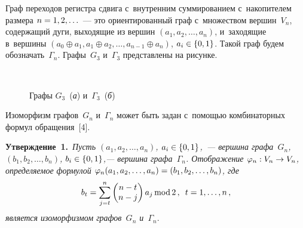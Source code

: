 \begin{multicols}{2}
  Граф переходов регистра сдвига с~внутренним суммированием 
с~накопителем размера $n\hm=1,2,\ldots$~--- это ориентированный граф 
с~множеством вершин~$V_n$, содержащий дуги, выходящие из вершин $(a_1, 
a_2, \ldots , a_n)$, и~заходящие в~вершины $(a_0\oplus a_1, a_1\oplus a_2, \ldots 
, a_{n-1}\oplus a_n)$, $a_i\hm\in \{0,1\}$. Такой граф будем 
обозначать~$\Gamma_n$. Графы~$G_3$ и~$\Gamma_3$ пред\-став\-ле\-ны на 
рисунке.
  
  \begin{figure*} %
\vspace*{1pt}
 \begin{center}
 \mbox{%
 \epsfxsize=158.296mm 
 }
\vspace*{6pt}

  {\small Графы $G_3$~(\textit{а}) и~$\Gamma_3$~(\textit{б})}
 \end{center}
\vspace*{-12pt}
  \end{figure*}
  
  Изоморфизм графов~$G_n$ и~$\Gamma_n$ может быть задан с~помощью 
комбинаторных формул обращения~[4].
  
  \smallskip
  
  \noindent
  \textbf{Утверждение~1.}\ \textit{Пусть $(a_1, a_2, \ldots , a_n)$, $a_i\hm\in 
\{0,1\}$,~--- вершина графа~$G_n$, $(b_1, b_2, \ldots , b_n)$, $b_i\hm\in 
\{0,1\}$,--- вершина графа~$\Gamma_n$. Отображение $\varphi_n: V_n\hm\to 
V_n$, определяемое формулой
  $\varphi_n (a_1, a_2, \ldots , a_n)\hm= (b_1, b_2, \ldots , b_n)$, где}
  $$
  b_t=\sum\limits^n_{j=t}  
\begin{pmatrix}  
n-t\\ n-j
  \end{pmatrix} a_j\,\mathrm{mod}\,2\,,\enskip t=1,\ldots ,n\,,
  $$
\textit{является изоморфизмом графов~$G_n$ и~$\Gamma_n$}.

\smallskip


\end{multicols}
